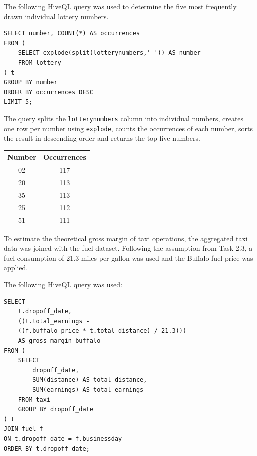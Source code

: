 \documentclass[12pt,ngerman]{scrartcl}
\begin{document}
\subexercise{}
\subexercise{}

\subexercise{}
\subexercise{}
\subexercise{}

\subexercise{}

The following HiveQL query was used to determine the five most frequently drawn individual lottery numbers.

\begin{verbatim}
SELECT number, COUNT(*) AS occurrences
FROM (
    SELECT explode(split(lotterynumbers,' ')) AS number
    FROM lottery
) t
GROUP BY number
ORDER BY occurrences DESC
LIMIT 5;
\end{verbatim}

The query splits the \texttt{lotterynumbers} column into individual numbers, creates one row per number using \texttt{explode}, counts the occurrences of each number, sorts the result in descending order and returns the top five numbers.

\begin{center}
\begin{tabular}{|c|c|}
\hline
Number & Occurrences \\
\hline
02 & 117 \\
20 & 113 \\
35 & 113 \\
25 & 112 \\
51 & 111 \\
\hline
\end{tabular}
\end{center}

\subexercise{}

To estimate the theoretical gross margin of taxi operations, the aggregated taxi data was joined with the fuel dataset. Following the assumption from Task 2.3, a fuel consumption of 21.3 miles per gallon was used and the Buffalo fuel price was applied.

The following HiveQL query was used:

\begin{verbatim}
SELECT
    t.dropoff_date,
    ((t.total_earnings -
    ((f.buffalo_price * t.total_distance) / 21.3)))
    AS gross_margin_buffalo
FROM (
    SELECT
        dropoff_date,
        SUM(distance) AS total_distance,
        SUM(earnings) AS total_earnings
    FROM taxi
    GROUP BY dropoff_date
) t
JOIN fuel f
ON t.dropoff_date = f.businessday
ORDER BY t.dropoff_date;
\end{verbatim}
\end{document}
